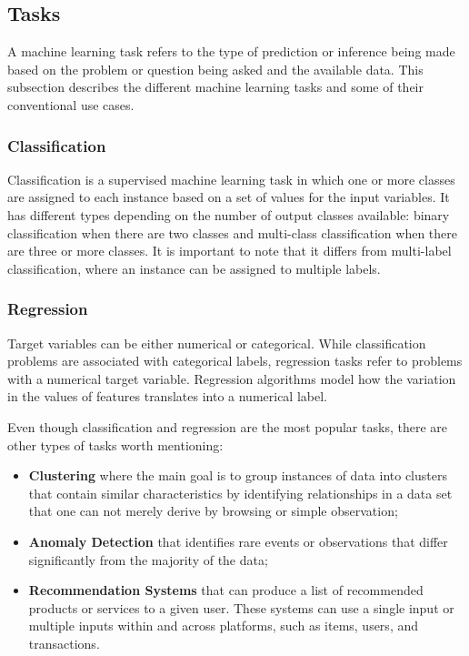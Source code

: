 \subsection{Tasks}
\label{sec:machine_learning_tasks}

A machine learning task refers to the type of prediction or inference being made based on the problem or question being asked and the available data. This subsection describes the different machine learning tasks and some of their conventional use cases.

\subsubsection{Classification}

Classification is a supervised machine learning task in which one or more classes are assigned to each instance based on a set of values for the input variables. It has different types depending on the number of output classes available: binary classification when there are two classes and multi-class classification when there are three or more classes. It is important to note that it differs from multi-label classification, where an instance can be assigned to multiple labels.

\subsubsection{Regression}

Target variables can be either numerical or categorical. While classification problems are associated with categorical labels, regression tasks refer to problems with a numerical target variable. Regression algorithms model how the variation in the values of features translates into a numerical label.

\bigbreak

\noindent Even though classification and regression are the most popular tasks, there are other types of tasks worth mentioning:

\begin{itemize}
    \item \textbf{Clustering} where the main goal is to group instances of data into clusters that contain similar characteristics by identifying relationships in a data set that one can not merely derive by browsing or simple observation;
    \item \textbf{Anomaly Detection} that identifies rare events or observations that differ significantly from the majority of the data;
    \item \textbf{Recommendation Systems} that can produce a list of recommended products or services to a given user. These systems can use a single input or multiple inputs within and across platforms, such as items, users, and transactions.
\end{itemize}

